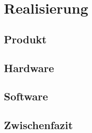 \chapter{Realisierung}
\label{Realisierung}

\section{Produkt}
\label{Produkt}
\Blindtext[2][3] 
\blinditemize

\section {Hardware}
\label{Hardware}

\section{Software}
\label{Software}

\section{Zwischenfazit}
\label{Zwischenfazit_01}